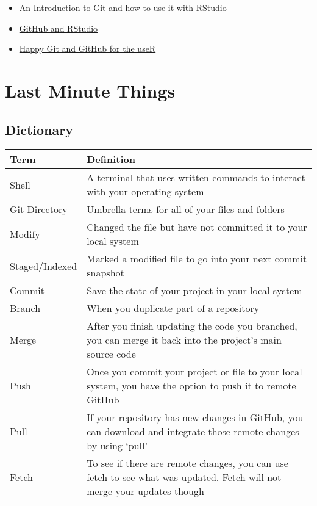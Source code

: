\documentclass[
]{article}
\providecommand{\tightlist}{%
  \setlength{\itemsep}{0pt}\setlength{\parskip}{0pt}}
\begin{document}
\begin{itemize}
\tightlist
\item
  \href{https://r-bio.github.io/intro-git-rstudio/}{An Introduction to
  Git and how to use it with RStudio}
\item
  \href{https://resources.github.com/whitepapers/github-and-rstudio/}{GitHub
  and RStudio}
\item
  \href{https://happygitwithr.com/connect-intro.html}{Happy Git and
  GitHub for the useR}
\end{itemize}

\hypertarget{last-minute-things}{%
\section{Last Minute Things}\label{last-minute-things}}

\hypertarget{dictionary}{%
\subsection{Dictionary}\label{dictionary}}

\begin{longtable}[]{@{}
  >{\raggedright\arraybackslash}p{}
  >{\raggedright\arraybackslash}p{}@{}}
\toprule
Term & Definition \\
\midrule
\endhead
Shell & A terminal that uses written commands to interact with your
operating system \\
Git Directory & Umbrella terms for all of your files and folders \\
Modify & Changed the file but have not committed it to your local
system \\
Staged/Indexed & Marked a modified file to go into your next commit
snapshot \\
Commit & Save the state of your project in your local system \\
Branch & When you duplicate part of a repository \\
Merge & After you finish updating the code you branched, you can merge
it back into the project's main source code \\
Push & Once you commit your project or file to your local system, you
have the option to push it to remote GitHub \\
Pull & If your repository has new changes in GitHub, you can download
and integrate those remote changes by using `pull' \\
Fetch & To see if there are remote changes, you can use fetch to see
what was updated. Fetch will not merge your updates though \\
\bottomrule
\end{longtable}
\end{document}
